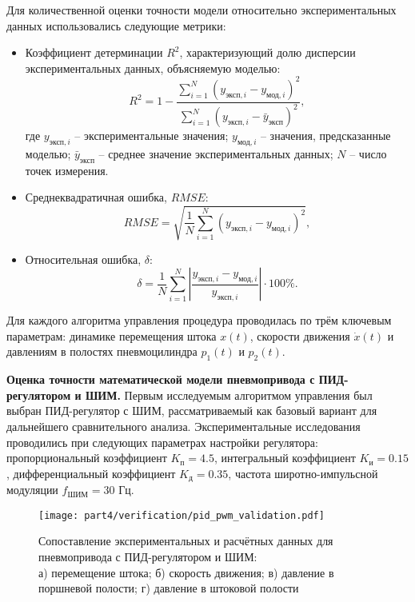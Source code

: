 Для количественной оценки точности модели относительно экспериментальных данных использовались следующие метрики:
\begin{itemize}
	\item Коэффициент детерминации $R^2$, характеризующий долю дисперсии экспериментальных данных, объясняемую моделью:
	      \begin{equation}
		      R^2 = 1 - \frac{\sum_{i=1}^{N} (y_{\text{эксп},i} - y_{\text{мод},i})^2}{\sum_{i=1}^{N} (y_{\text{эксп},i} - \bar{y}_{\text{эксп}})^2},
	      \end{equation}
	      где $y_{\text{эксп},i}$ -- экспериментальные значения;
	      $y_{\text{мод},i}$ -- значения, предсказанные моделью;
	      $\bar{y}_{\text{эксп}}$ -- среднее значение экспериментальных данных;
	      $N$ -- число точек измерения.

	\item Среднеквадратичная ошибка, $RMSE$:
	      \begin{equation}
		      RMSE = \sqrt{\frac{1}{N} \sum_{i=1}^{N} (y_{\text{эксп},i} - y_{\text{мод},i})^2},
	      \end{equation}

	\item Относительная ошибка, $\delta$:
	      \begin{equation}
		      \delta = \frac{1}{N} \sum_{i=1}^{N} \left| \frac{y_{\text{эксп},i} - y_{\text{мод},i}}{y_{\text{эксп},i}} \right| \cdot 100\%.
	      \end{equation}
\end{itemize}

Для каждого алгоритма управления процедура проводилась по трём ключевым параметрам: динамике перемещения штока
$x(t)$, скорости движения $\dot{x}(t)$ и давлениям в полостях пневмоцилиндра $p_1(t)$ и $p_2(t)$.

\textbf{Оценка точности математической модели пневмопривода с ПИД-регулятором и ШИМ.}
Первым исследуемым алгоритмом управления был выбран ПИД-регулятор с ШИМ,
рассматриваемый как базовый вариант для дальнейшего сравнительного анализа.
Экспериментальные исследования проводились при следующих параметрах настройки регулятора:
пропорциональный коэффициент $K_\text{п} = \num{4.5}$, интегральный коэффициент $K_\text{и} =\num{0.15}$,
дифференциальный коэффициент $K_\text{д} = \num{0.35}$, частота широтно-импульсной модуляции $f_{\text{ШИМ}} = 30$ Гц.

\begin{figure}[ht]
	\centering
	\texttt{[image: part4/verification/pid\_pwm\_validation.pdf]}
	\caption{Сопоставление экспериментальных и расчётных данных для пневмопривода с ПИД-регулятором и ШИМ:\\
		а) перемещение штока; б) скорость движения; в) давление в поршневой полости; г) давление в штоковой полости}
	\label{fig:pid_pwm_validation}
\end{figure}

